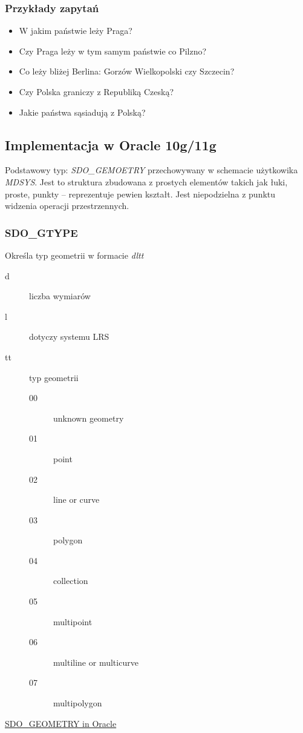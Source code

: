 \documentclass[12pt]{article}
\begin{document}
\subsubsection{Przykłady zapytań}
\begin{itemize}
\item W jakim państwie leży Praga?
\item Czy Praga leży w tym samym państwie co Pilzno?
\item Co leży bliżej Berlina: Gorzów Wielkopolski czy Szczecin?
\item Czy Polska graniczy z Republiką Czeską?
\item Jakie państwa sąsiadują z Polską?
\end{itemize}

\subsection{Implementacja w Oracle 10g/11g}
Podstawowy typ: \emph{SDO\_GEMOETRY} przechowywany w schemacie użytkowika
\emph{MDSYS}.  Jest to struktura zbudowana z prostych elementów takich jak
łuki, proste, punkty -- reprezentuje pewien kształt. Jest niepodzielna z punktu
widzenia operacji przestrzennych.

\subsubsection{SDO\_GTYPE}
Określa typ geometrii w formacie \emph{dltt}
\begin{description}
\item[d] liczba wymiarów
\item[l] dotyczy systemu \ac{LRS}
\item[tt] typ geometrii
\begin{description}
\item[00] unknown geometry
\item[01] point
\item[02] line or curve
\item[03] polygon
\item[04] collection
\item[05] multipoint
\item[06] multiline or multicurve
\item[07] multipolygon
\end{description}
\end{description}
\href{http://download.oracle.com/docs/cd/B10501\_01/appdev.920/a96630/sdo\_objrelschema.htm}{SDO\_GEOMETRY in Oracle}
\end{document}
